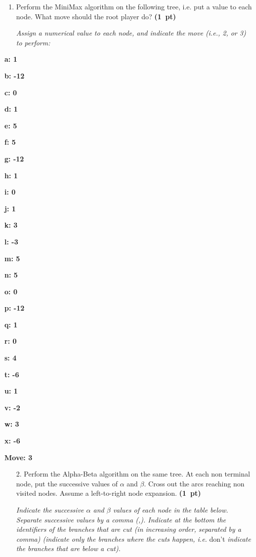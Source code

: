 \documentclass[11pt,a4paper]{report}
\begin{document}
\begin{enumerate}
\item Perform the MiniMax algorithm on the following tree, i.e.
      put a value to each node. What move should the root player do? \textbf{(1~pt)}
      
      \textit{Assign a numerical value to each node, and indicate the move (i.e., 2, or 3) to perform:}
\end{enumerate}
      \begin{answers}[3cm]
      \begin{multicols}{5}
      \textbf{a: 1}
      
      \textbf{b: -12}
      
      \textbf{c: 0}
      
      \textbf{d: 1}
      
      \textbf{e: 5}
      
      \textbf{f: 5}
      
      \textbf{g: -12}
      
      \textbf{h: 1}
      
      \textbf{i: 0}
      
      \textbf{j: 1}
      
      \textbf{k: 3}
      
      \textbf{l: -3}
      
      \textbf{m: 5}
      
      \textbf{n: 5}
      
      \textbf{o: 0}
      
      \textbf{p: -12}
      
      \textbf{q: 1}
      
      \textbf{r: 0}
      
      \textbf{s: 4}
      
      \textbf{t: -6}
      
      \textbf{u: 1}
      
      \textbf{v: -2}
      
      \textbf{w: 3}
      
      \textbf{x: -6}
      
      \textbf{Move: 3}
      \end{multicols}
	  \end{answers}



\begin{enumerate}
\item[2.] Perform the Alpha-Beta algorithm on the same tree.
      At each non terminal node, put the successive values of $\alpha$ and
      $\beta$. Cross out the arcs reaching non visited nodes. Assume a
      left-to-right node expansion. \textbf{(1~pt)}
      
      \textit{Indicate the successive $\alpha$ and $\beta$ values of each node in the table below. Separate successive values by a comma (,). Indicate at the bottom the identifiers of the branches that are cut (in increasing order, separated by a comma) (indicate only the branches where the cuts happen, i.e.\!} don't \textit{indicate the branches that are below a cut).}
\end{enumerate}
\end{document}
